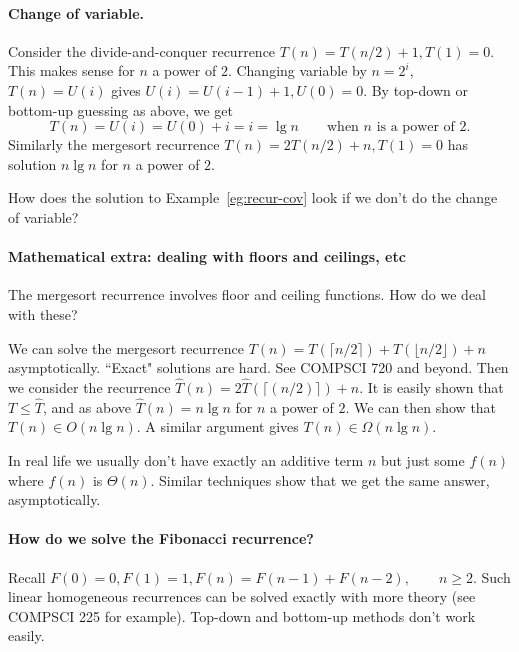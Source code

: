 \paragraph{Change of variable.}
\begin{Example}
\label{eg:recur-cov}
Consider the divide-and-conquer recurrence $T(n) = T(n/2) + 1, T(1) = 0$. 
This makes sense for $n$ a power of $2$.
Changing variable by $n = 2^i$, $T(n) = U(i)$ 
gives $U(i) = U(i-1) + 1, U(0) = 0$. 
By top-down or bottom-up guessing as above, we get 
$$T(n) = U(i) = U(0) + i = i = \lg n \qquad \text{when } n \text{ is a power of }2\text{.}$$
Similarly the mergesort recurrence $T(n) = 2T(n/2) + n, T(1)  = 0$ 
has solution $n \lg n$ for $n$ a power of $2$.
\end{Example}


\begin{Boxample}[6]
How does the solution to Example~\ref{eg:recur-cov} look if we don't do the change of variable?

\end{Boxample}



\paragraph{Mathematical extra: dealing with floors and ceilings, etc}
The mergesort recurrence involves floor and ceiling functions. How do we deal with these?

We can solve the mergesort recurrence $T(n) = T(\lceil n/2 \rceil) + T(\lfloor n/2 \rfloor) + n$ asymptotically. 
``Exact" solutions are hard. See COMPSCI 720 and beyond. Then we consider the recurrence $\hat{T}(n) =
2\hat{T}(\lceil(n/2)\rceil) + n$. It is easily shown that $T \leq \hat{T}$, and 
as above $\hat{T}(n) = n \lg n$ for $n$ a power of $2$. We can then show that $T(n)
\in O(n \lg n)$. A similar argument gives $T(n) \in \Omega(n \lg n)$.

In real life we usually don't have exactly an additive term $n$
but just some $f(n)$ where $f(n)$ is $\Theta(n)$. Similar techniques show that 
we get the same answer, asymptotically. 


\paragraph{How do we solve the Fibonacci recurrence?}

Recall $F(0) = 0, F(1) = 1, F(n) = F(n-1) + F(n-2), \qquad n \geq 2$.
Such linear homogeneous recurrences can be solved exactly with
more theory (see COMPSCI 225 for example).
Top-down and bottom-up methods don't work easily. 

